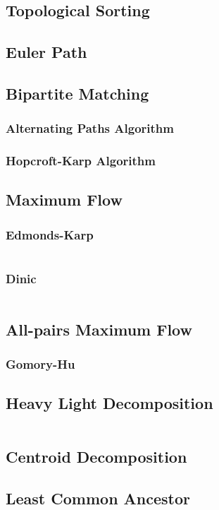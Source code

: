\documentclass[8pt,a4paper,landscape,oneside]{amsart}
\newcommand{\code}[1]{\inputminted[fontsize=\normalsize,baselinestretch=1]{cpp}{_code/#1}}
\begin{document}
\begin{multicols*}{3}
	\subsection{Topological Sorting}
	\subsection{Euler Path}
	\subsection{Bipartite Matching}
		\subsubsection{Alternating Paths Algorithm}
		\subsubsection{Hopcroft-Karp Algorithm}
	\subsection{Maximum Flow}
		\subsubsection{Edmonds-Karp}
			\code{graphs/max_flow/edmonds_karp.cpp}
		\subsubsection{Dinic}
			\code{graphs/max_flow/dinic.cpp}
  \subsection{All-pairs Maximum Flow}
    \subsubsection{Gomory-Hu}
  \subsection{Heavy Light Decomposition}
    \code{graphs/heavy_light_decomposition.cpp}
	\subsection{Centroid Decomposition}
	\subsection{Least Common Ancestor}

\end{multicols*}
\end{document}
